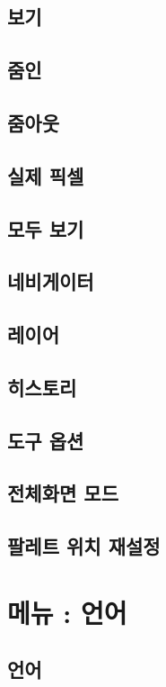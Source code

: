 \documentclass[12pt, a4paper, oneside]{book}
\let\stdsection\section
\renewcommand\section{\newpage\stdsection}
\begin{document}
\section{	보기	}
\section{	줌인				}							
\section{	줌아웃				}							
\section{	실제 픽셀				}							
\section{	모두 보기				}							
\section{	네비게이터				}							
\section{	레이어				}							
\section{	히스토리				}							
\section{	도구 옵션				}							
\section{	전체화면 모드				}							
\section{	팔레트 위치 재설정				}							



	\chapter{메뉴 : 언어} 
	\minitoc
\section{	언어	}
\end{document}
